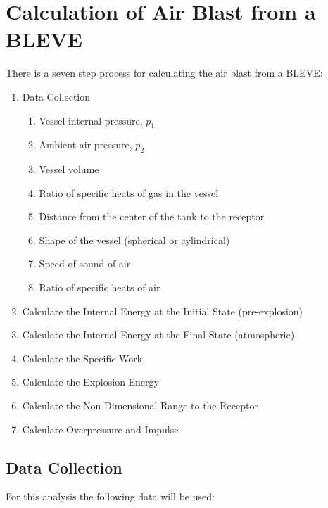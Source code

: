 \documentclass[10pt,parskip=half,
toc=sectionentrywithdots,
bibliography=totocnumbered,
captions=tableheading,numbers=noendperiod]{scrartcl}
\providecommand{\tightlist}{%
  \setlength{\itemsep}{0pt}\setlength{\parskip}{0pt}}
\begin{document}
\hypertarget{calculation-of-air-blast-from-a-bleve}{%
\section{Calculation of Air Blast from a
BLEVE}\label{calculation-of-air-blast-from-a-bleve}}

There is a seven step process for calculating the air blast from a
BLEVE:

\begin{enumerate}
\def\labelenumi{\arabic{enumi}.}
\tightlist
\item
  Data Collection

  \begin{enumerate}
  \def\labelenumii{\arabic{enumii}.}
  \tightlist
  \item
    Vessel internal pressure, \(p_1\)
  \item
    Ambient air pressure, \(p_2\)
  \item
    Vessel volume
  \item
    Ratio of specific heats of gas in the vessel
  \item
    Distance from the center of the tank to the receptor
  \item
    Shape of the vessel (spherical or cylindrical)
  \item
    Speed of sound of air
  \item
    Ratio of specific heats of air\\
  \end{enumerate}
\item
  Calculate the Internal Energy at the Initial State (pre-explosion)
\item
  Calculate the Internal Energy at the Final State (atmospheric)
\item
  Calculate the Specific Work
\item
  Calculate the Explosion Energy
\item
  Calculate the Non-Dimensional Range to the Receptor
\item
  Calculate Overpressure and Impulse
\end{enumerate}

\hypertarget{data-collection}{%
\subsection{Data Collection}\label{data-collection}}

For this analysis the following data will be used:
\end{document}
